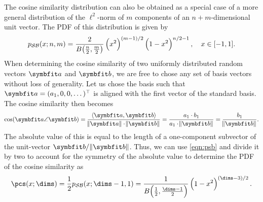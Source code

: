 The cosine similarity distribution can also be obtained as a special case of a more general distribution of the $\ell^2$-norm of $m$ components of an $n+m$-dimensional unit vector.
The PDF of this distribution is given by \textcite{harman2010,gosmann216}
\begin{equation}
    p_{\mathcal{SB}}(x; n, m) = \frac{2}{B\!\del{\frac{n}{2}, \frac{m}{2}}} \del{x^2}^{(m-1)/2} \del{1 - x^2}^{n/2 - 1},\quad x \in [-1, 1] \text{.}\label{eqn:psb}
\end{equation}
When determining the cosine similarity of two uniformly distributed random vectors $\vc a$ and $\vc b$, we are free to chose any set of basis vectors without loss of generality.
Let us chose the basis such that $\vc a = (a_1, 0, 0, \dots)\Tr$ is aligned with the first vector of the standard basis.
The cosine similarity then becomes
\begin{equation}
    \cos(\vc a \angle \vc b) = \frac{\langle \vc a, \vc b \rangle}{\norm{\vc a} \cdot \norm{\vc b}} = \frac{a_1 \cdot b_1}{a_1 \cdot \norm{\vc b}} = \frac{b_1}{\norm{\vc b}} \text{.}
\end{equation}
The absolute value of this is equal to the length of a one-component subvector of the unit-vector $\vc b/\norm{\vc b}$.
Thus, we can use \cref{eqn:psb} and divide it by two to account for the symmetry of the absolute value to determine the PDF of the cosine similarity as
\begin{equation}
    \pcs(x; \dims) = \frac{1}{2} p_{\mathcal{SB}}(x; \dims - 1, 1) = \frac{1}{B\!\del{\frac{1}{2}, \frac{\dims - 1}{2}}} \del{1 - x^2}^{\del{\dims - 3}/2}\text{.}
\end{equation}
